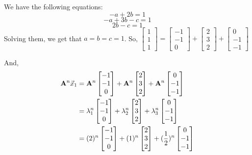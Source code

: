 \begin{enumerate}
{    We have the following equations:
    $$-a + 2b = 1$$
    $$-a + 3b - c = 1$$
    $$2b - c = 1$$
    Solving them, we get that $a = b = c = 1$. So, $\begin{bmatrix}1 \\ 1 \\ 1\end{bmatrix} = \begin{bmatrix}-1 \\ -1 \\ 0\end{bmatrix} + \begin{bmatrix}2 \\ 3 \\ 2\end{bmatrix} + \begin{bmatrix}0 \\ -1 \\ -1\end{bmatrix}$ 
    
    And, 
    \begin{align*}
    \mathbf{A}^n\vec{x}_1 &= \mathbf{A}^n \begin{bmatrix}-1 \\ -1 \\ 0\end{bmatrix} + \mathbf{A}^n \begin{bmatrix}2 \\ 3 \\ 2\end{bmatrix} + \mathbf{A}^n \begin{bmatrix}0 \\ -1 \\ -1\end{bmatrix} \\
    &= \lambda_1^n \begin{bmatrix}-1 \\ -1 \\ 0\end{bmatrix} + \lambda_2^n \begin{bmatrix}2 \\ 3 \\ 2\end{bmatrix} + \lambda_3^n \begin{bmatrix}0 \\ -1 \\ -1\end{bmatrix} \\
    &= (2)^n \begin{bmatrix}-1 \\ -1 \\ 0\end{bmatrix} + (1)^n \begin{bmatrix}2 \\ 3 \\ 2\end{bmatrix} + (\frac{1}{2})^n \begin{bmatrix}0 \\ -1 \\ -1\end{bmatrix} \\
    \end{align*}
    
}
\end{enumerate}
